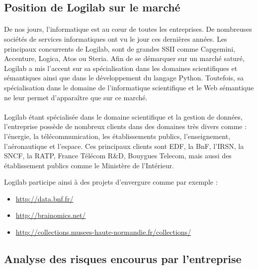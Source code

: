 \documentclass {report}
\begin{document}
\subsection{Position de Logilab sur le marché}
\paragraph{}
De nos jours, l'informatique est au cœur de toutes les entreprises. De nombreuses sociétés de services informatiques ont vu le jour ces dernières années. Les principaux concurrents de Logilab, sont de grandes SSII comme Capgemini, Accenture, Logica, Atos ou Steria. Afin de se démarquer sur un marché saturé, Logilab a mis l'accent sur sa spécialisation dans les domaines scientifiques et sémantiques ainsi que dans le développement du langage Python. Toutefois, sa spécialisation dans le domaine de l'informatique scientifique et le Web sémantique ne leur permet d'apparaître que sur ce marché.

\paragraph{}
Logilab étant spécialisée dans le domaine scientifique et la gestion de données, l'entreprise possède de nombreux clients dans des domaines très divers comme : l'énergie, la télécommunication, les établissements publics, l'enseignement, l'aéronautique et l'espace. Ces principaux clients sont EDF, la BnF\footnotemark[1], l'IRSN\footnotemark[2], la SNCF, la  RATP, France Télécom R\&D, Bouygues Telecom, mais aussi des établissement publics comme le Ministère de l'Intérieur.


    Logilab participe ainsi à des projets d'envergure comme par exemple :
\begin{itemize}
\item \url{http://data.bnf.fr/}
\item \url{http://brainomics.net/}
\item \url{http://collections.musees-haute-normandie.fr/collections/}
\end{itemize}

\subsection{Analyse des risques encourus par l'entreprise}
\end{document}

